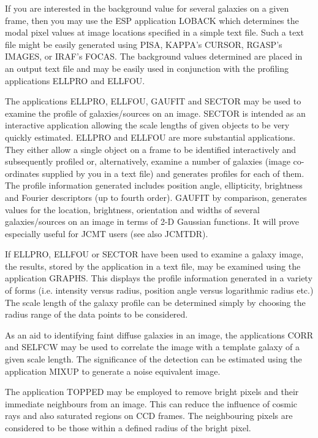 \documentclass[twoside,11pt]{article}
\newcommand{\xref}[3]{#1}
\begin{document}
If you are interested in the background value for several galaxies on a
given frame, then you may use the ESP application LOBACK which
determines the modal pixel values at image locations specified in a
simple text file. Such a text file might be easily generated using
\xref{PISA}{sun109}{}, \xref{KAPPA}{sun95}{}'s CURSOR, RGASP's IMAGES, or 
\xref{IRAF}{sun179}{}'s 
FOCAS. The background
values determined are placed in an output text file and may be easily
used in conjunction with the profiling applications ELLPRO and ELLFOU.

The applications ELLPRO, ELLFOU, GAUFIT and SECTOR may be used to examine the
profile of galaxies/sources on an image. SECTOR is intended as an interactive
application allowing the scale lengths of given objects to be very
quickly estimated. ELLPRO and ELLFOU are more substantial applications.
They either allow a single object on a frame to be identified
interactively and subsequently profiled or, alternatively, examine a
number of galaxies (image co-ordinates supplied by you in a text file)
and generates profiles for each of them.  The profile information
generated includes position angle, ellipticity, brightness and Fourier
descriptors (up to fourth order). GAUFIT by comparison, generates
values for the location, brightness, orientation and widths of several 
galaxies/sources on an image in terms of 2-D Gaussian functions. It will prove 
especially useful for JCMT users (see also \xref{JCMTDR}{sun132}{}).  

If ELLPRO, ELLFOU or SECTOR have been used to examine a galaxy image,
the results, stored by the application in a text file, may be examined 
using the application GRAPHS. This displays the profile information 
generated in a variety of forms (i.e. intensity versus radius, 
position angle versus logarithmic radius etc.) The scale length of the
galaxy profile can be determined simply by choosing the radius range 
of the data points to be considered.

As an aid to identifying faint diffuse galaxies in an image, the applications
CORR and SELFCW may be used to correlate the image with a template 
galaxy of a given scale length. The significance of the detection can
be estimated using the application MIXUP to generate a noise equivalent
image. 

The application TOPPED may be employed to remove bright pixels and their
immediate neighbours from an image. This can reduce the influence of cosmic
rays and also saturated regions on CCD frames. The neighbouring pixels are 
considered to be those within a defined radius of the bright pixel.
\end{document}
